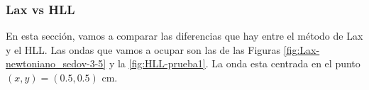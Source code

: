 \documentclass[12pt,a4paper]{book}
\begin{document}
\subsubsection{Lax vs HLL}\label{subs:Lax_vs_HLl}

En esta sección, vamos a comparar las diferencias que hay entre el método de Lax y el HLL. Las ondas que vamos a ocupar son las de las Figuras \ref{fig:Lax-newtoniano_sedov-3-5} y la \ref{fig:HLL-prueba1}. La onda esta centrada en el punto $(x,y)=(0.5,0.5)$ cm.



\end{document}

